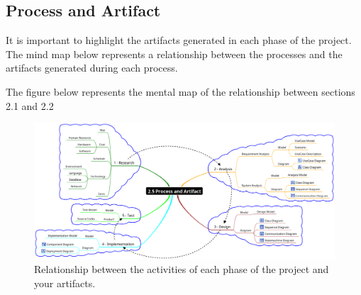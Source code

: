 \documentclass[11pt, twoside, a4paper]{book}
\begin{document}
			\begin{landscape}
			 	
			 	\section{Process and Artifact}
				
				It is important to highlight the artifacts generated in each phase of the project. The mind map below represents a relationship between the processes and the artifacts generated during each process.
				
					The figure below represents the mental map of the relationship between sections 2.1 and 2.2

					\begin{figure}[!ht]
						\centering
  						\includegraphics[scale=0.3]{2-5_Process_and_Artifact.eps}
						\caption{Relationship between the activities of each phase of the project and your artifacts.}
					\end{figure}  					
					
			\end{landscape}

				
\end{document}
